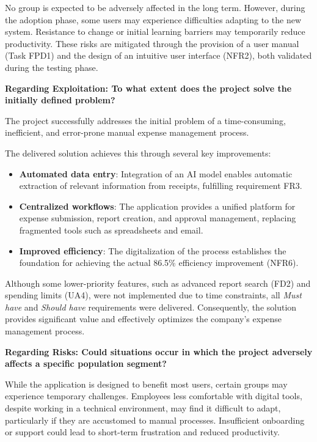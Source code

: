 No group is expected to be adversely affected in the long term. However, during the adoption phase, some users may experience difficulties adapting to the new system. Resistance to change or initial learning barriers may temporarily reduce productivity. These risks are mitigated through the provision of a user manual (Task FPD1) and the design of an intuitive user interface (NFR2), both validated during the testing phase.

\textbf{Regarding Exploitation: To what extent does the project solve the initially defined problem?}

The project successfully addresses the initial problem of a time-consuming, inefficient, and error-prone manual expense management process.

The delivered solution achieves this through several key improvements:

\begin {itemize} [leftmargin=0.75cm, noitemsep, label=$\bullet$]

    \item \textbf{Automated data entry}: Integration of an AI model enables automatic extraction of relevant information from receipts, fulfilling requirement FR3.

    \item \textbf{Centralized workflows}: The application provides a unified platform for expense submission, report creation, and approval management, replacing fragmented tools such as spreadsheets and email.

    \item \textbf{Improved efficiency}: The digitalization of the process establishes the foundation for achieving the actual 86.5\% efficiency improvement (NFR6).

\end{itemize}
Although some lower-priority features, such as advanced report search (FD2) and spending limits (UA4), were not implemented due to time constraints, all \textit{Must have} and \textit{Should have} requirements were delivered. Consequently, the solution provides significant value and effectively optimizes the company's expense management process.

\textbf{Regarding Risks: Could situations occur in which the project adversely affects a specific population segment?}

While the application is designed to benefit most users, certain groups may experience temporary challenges. Employees less comfortable with digital tools, despite working in a technical environment, may find it difficult to adapt, particularly if they are accustomed to manual processes. Insufficient onboarding or support could lead to short-term frustration and reduced productivity.

